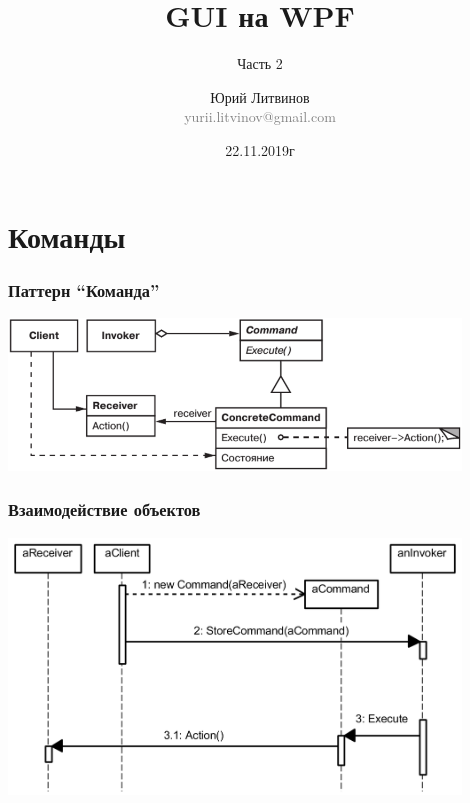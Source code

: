 \documentclass[xetex,mathserif,serif]{beamer}
\title{GUI на WPF}
\subtitle{Часть 2}
\author[Юрий Литвинов]{Юрий Литвинов\\\small{\textcolor{gray}{yurii.litvinov@gmail.com}}}
\date{22.11.2019г}
\begin{document}
	\frame{\titlepage}

	\section{Команды}

	\begin{frame}
		\frametitle{Паттерн ``Команда''}
		\begin{center}
			\includegraphics[width=0.9\textwidth]{command.png}
		\end{center}
	\end{frame}

	\begin{frame}
		\frametitle{Взаимодействие объектов}
		\begin{center}
			\includegraphics[width=0.9\textwidth]{commandSequence.png}
		\end{center}
	\end{frame}
\end{document}
